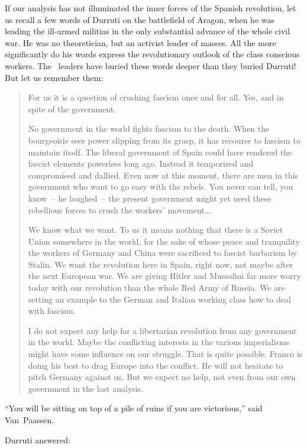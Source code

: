 If our analysis has not illuminated the inner forces of the Spanish revolution, let us recall a few words of Durruti on the battlefield of Aragon, when he was leading the ill-armed militias in the only substantial advance of the whole civil war. He was no theoretician, but an activist leader of masses. All the more significantly do his words express the revolutionary outlook of the class conscious workers. The \CNT\ leaders have buried these words deeper than they buried Durruti! But let us remember them:

\begin{quotation}
  For us it is a question of crushing fascism once and for all. Yes, and in spite of the government.
  
  No government in the world fights fascism to the death. When the bourgeoisie sees power slipping from its grasp, it has recourse to fascism to maintain itself. The liberal government of Spain could have rendered the fascist elements powerless long ago. Instead it temporized and compromised and dallied. Even now at this moment, there are men in this government who want to go easy with the rebels. You never can tell, you know~-- he laughed~-- the present government might yet need these rebellious forces to crush the workers’ movement\dots.
  
  We know what we want. To us it means nothing that there is a Soviet Union somewhere in the world, for the sake of whose peace and tranquility the workers of Germany and China were sacrificed to fascist barbarism by Stalin. We want the revolution here in Spain, right now\kn, not maybe after the next European war. We are giving Hitler and Mussolini far more worry today with our revolution than the whole Red Army of Russia. We are setting an example to the German and Italian working class how to deal with fascism.
  
  I do not expect any help for a libertarian revolution from any government in the world. Maybe the conflicting interests in the various imperialisms might have some influence on our struggle. That is quite possible. Franco is doing his best to drag Europe into the conflict. He will not hesitate to pitch Germany against us. But we expect no help, not even from our own government in the last analysis.
\end{quotation}

``You will be sitting on top of a pile of ruins if you are victorious,'' said Van~Paassen.

\medskip

\noindent
Durruti answered:

